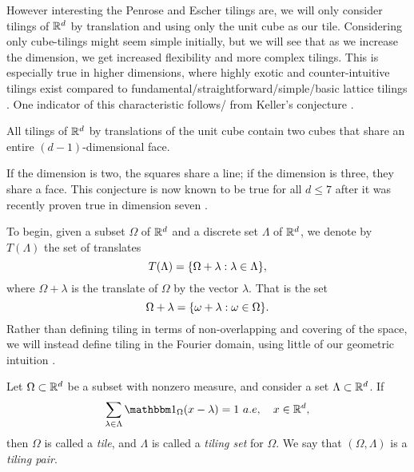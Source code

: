 \documentclass[../thesis.tex]{subfiles}
\begin{document}
However interesting the Penrose and Escher tilings are, we will only consider tilings of $\mathbb{R}^d$ by translation and using only the unit cube as our tile. Considering only cube-tilings might seem simple initially, but we will see that as we increase the dimension, we get increased flexibility and more complex tilings. This is especially true in higher dimensions, where highly exotic and counter-intuitive tilings exist compared to fundamental/straightforward/simple/basic lattice tilings \cite{iosevichSpectralTilingProperties1998}. One indicator of this characteristic follows/ from Keller's conjecture \cite{ott-heinrichkellerUberLuckenloseErfullung1930}. 

\begin{conjecture}
    All tilings of $\mathbb{R}^d$ by translations of the unit cube contain two cubes that share an entire $(d-1)$-dimensional face.
\end{conjecture}
If the dimension is two, the squares share a line; if the dimension is three, they share a face. This conjecture is now known to be true for all $d\leq 7$ after it was recently proven true in dimension seven \cite{brakensiekResolutionKellerConjecture2020}. 


To begin, given a subset $\Omega$ of $\mathbb{R}^d$ and a discrete set $\Lambda$ of $\mathbb{R}^d$, we denote by $T(\Lambda)$ the set of translates 
\begin{equation*}
    T(\Lambda) = \{\Omega+\lambda : \lambda\in \Lambda\},
\end{equation*}
where $\Omega + \lambda$ is the translate of $\Omega$ by the vector $\lambda$. That is the set
\begin{equation*}
    \Omega + \lambda = \{\omega + \lambda : \omega \in \Omega\}.
\end{equation*}
Rather than defining tiling in terms of non-overlapping and covering of the space, we will instead define tiling in the Fourier domain, using little of our geometric intuition \cite{kolountzakisTilingsTranslation2010} \cite{kolountzakisStudyTranslationalTiling2003}. 

\begin{definition}
    Let $\Omega \subset \mathbb{R}^d$ be a subset with nonzero measure, and consider a set $\Lambda \subset \mathbb{R}^d$. If
    \begin{equation}\label{eq:tiling_set}
        \sum_{\lambda \in \Lambda} \indicator{\Omega}{x-\lambda} = 1 \text{\space} a.e , \quad x \in \R^d,
    \end{equation}
    then $\Omega$ is called a \emph{tile}, and $\Lambda$ is called a \emph{tiling set} for $\Omega$. We say that $(\Omega, \Lambda)$ is a \emph{tiling pair}.
\end{definition}
\end{document}
